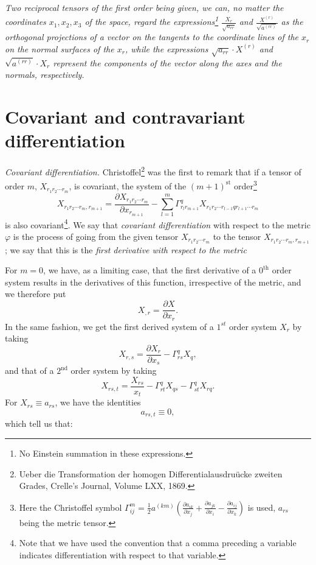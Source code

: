 \documentclass{book}
\begin{document}
\emph{Two reciprocal tensors of the first order being given, we can, no matter the coordinates $x_1,x_2,x_3$ of the space, regard the expressions\footnote{No Einstein summation in these expressions.} $\frac{X_r}{\sqrt{a_{rr}}}$ and $\frac{X^{(r)}}{\sqrt{a^{(rr)}}}$ as the orthogonal projections of a vector on the tangents to the coordinate lines of the $x_r$ on the normal surfaces of the $x_r$, while the expressions $\sqrt{a_{rr}}\cdot X^{(r)}$ and $\sqrt{a^{(rr)}}\cdot X_r$ represent the components of the vector along the axes and the normals, respectively.}

\section{Covariant and contravariant differentiation}
\emph{Covariant differentiation.} Christoffel\footnote{Ueber die Transformation der homogen Differentialausdru\"ucke zweiten Grades, Crelle's Journal, Volume LXX, 1869.} was the first to remark that if a tensor of order $m$, $X_{r_1r_2\cdots r_m}$, is covariant, the system of the $(m+1)^{\text{st}}$ order\footnote{Here the Christoffel symbol $\Gamma_{ij}^m=\frac{1}{2}a^{(km)}\left(\frac{\partial a_{ik}}{\partial x_j}+\frac{\partial a_{jk}}{\partial x_i}-\frac{\partial a_{ij}}{\partial x_k}\right)$ is used, $a_{rs}$ being the metric tensor.}
\begin{equation}
X_{r_1r_2\cdots r_m,r_{m+1}}=\frac{\partial X_{r_1r_2\cdots r_m}}{\partial x_{r_{m+1}}}-\sum_{l=1}^m\Gamma^q_{r_lr_{m+1}}X_{r_1r_2\cdots r_{l-1}qr_{l+1}\cdots r_m}
\end{equation}
is also covariant\footnote{Note that we have used the convention that a comma preceding a variable indicates differentiation with respect to that variable.}. We say that \emph{covariant differentiation} with respect to the metric $\varphi$ is the process of going from the given tensor $X_{r_1r_2\cdots r_m}$ to the tensor $X_{r_1r_2\cdots r_m,r_{m+1}}$; we say that this is the \emph{first derivative with respect to the metric}

For $m=0$, we have, as a limiting case, that the first derivative of a $0^{\text{th}}$ order system results in the derivatives of this function, irrespective of the metric, and we therefore put
\begin{equation*}
\tag{$1.19'$}
X_{,r}=\frac{\partial X}{\partial x_r}.
\end{equation*}
In the same fashion, we get the first derived system of a $1^{st}$ order system $X_r$ by taking
\begin{equation*}
\tag{$1.19''$}
X_{r,s}=\frac{\partial X_r}{\partial x_s}-\Gamma^q_{rs}X_q,
\end{equation*}
and that of a $2^{\text{nd}}$ order system by taking
\begin{equation*}
\tag{$1.19'''$}
X_{rs,t}=\frac{X_{rs}}{x_t}-\Gamma^q_{rt}X_{qs}-\Gamma^q_{st}X_{rq}.
\end{equation*}	
For $X_{rs}\equiv a_{rs}$, we have the identities
$$a_{rs,t}\equiv0,$$
which tell us that:
\end{document}
